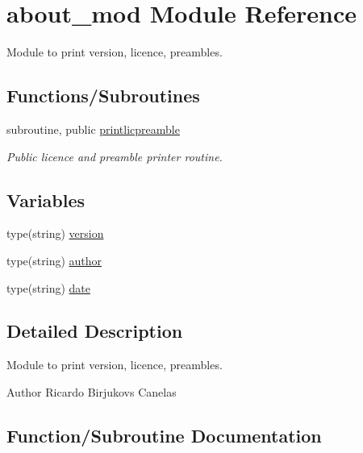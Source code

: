 \hypertarget{namespaceabout__mod}{}\section{about\+\_\+mod Module Reference}
\label{namespaceabout__mod}


Module to print version, licence, preambles.  


\subsection*{Functions/\+Subroutines}
\begin{DoxyCompactItemize}
\item 
subroutine, public \hyperlink{namespaceabout__mod_a9fb866e1576b843b42649d84b80f4b52}{printlicpreamble}
\begin{DoxyCompactList}\small\item\em Public licence and preamble printer routine. \end{DoxyCompactList}\end{DoxyCompactItemize}
\subsection*{Variables}
\begin{DoxyCompactItemize}
\item 
type(string) \hyperlink{namespaceabout__mod_af0051041c5a98e3eb7284580236db3a0}{version}
\item 
type(string) \hyperlink{namespaceabout__mod_a7c3a72ae7ba5fc7d8a4bf133605f58c3}{author}
\item 
type(string) \hyperlink{namespaceabout__mod_aaac12f65380fb0f10916b3744d9e5a0b}{date}
\end{DoxyCompactItemize}


\subsection{Detailed Description}
Module to print version, licence, preambles. 

\begin{DoxyAuthor}{Author}
Ricardo Birjukovs Canelas 
\end{DoxyAuthor}


\subsection{Function/\+Subroutine Documentation}
\mbox{\label{namespaceabout__mod_a9fb866e1576b843b42649d84b80f4b52}} 
